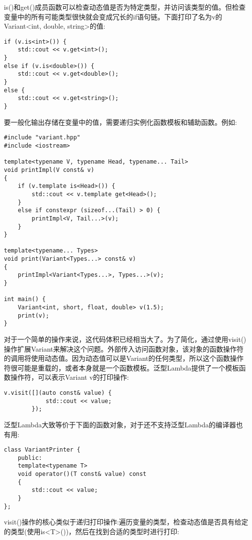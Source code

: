 
is()和get()成员函数可以检查动态值是否为特定类型，并访问该类型的值。但检查变量中的所有可能类型很快就会变成冗长的if语句链。下面打印了名为v的Variant<int, double, string>的值:

\begin{lstlisting}[style=styleCXX]
if (v.is<int>()) {
	std::cout << v.get<int>();
}
else if (v.is<double>()) {
	std::cout << v.get<double>();
}
else {
	std::cout << v.get<string>();
}
\end{lstlisting}

要一般化输出存储在变量中的值，需要递归实例化函数模板和辅助函数。例如:

\begin{lstlisting}[style=styleCXX]
#include "variant.hpp"
#include <iostream>

template<typename V, typename Head, typename... Tail>
void printImpl(V const& v)
{
	if (v.template is<Head>()) {
		std::cout << v.template get<Head>();
	}
	else if constexpr (sizeof...(Tail) > 0) {
		printImpl<V, Tail...>(v);
	}
}

template<typename... Types>
void print(Variant<Types...> const& v)
{
	printImpl<Variant<Types...>, Types...>(v);
}

int main() {
	Variant<int, short, float, double> v(1.5);
	print(v);
}
\end{lstlisting}

对于一个简单的操作来说，这代码体积已经相当大了。为了简化，通过使用visit()操作扩展Variant来解决这个问题。外部传入访问函数对象，该对象的函数操作符的调用将使用动态值。因为动态值可以是Variant的任何类型，所以这个函数操作符很可能是重载的，或者本身就是一个函数模板。泛型Lambda提供了一个模板函数操作符，可以表示Variant v的打印操作:

\begin{lstlisting}[style=styleCXX]
v.visit([](auto const& value) {
			std::cout << value;
		});
\end{lstlisting}

泛型Lambda大致等价于下面的函数对象，对于还不支持泛型Lambda的编译器也有用:

\begin{lstlisting}[style=styleCXX]
class VariantPrinter {
	public:
	template<typename T>
	void operator()(T const& value) const
	{
		std::cout << value;
	}
};
\end{lstlisting}

visit()操作的核心类似于递归打印操作:遍历变量的类型，检查动态值是否具有给定的类型(使用is<T>())，然后在找到合适的类型时进行打印:

